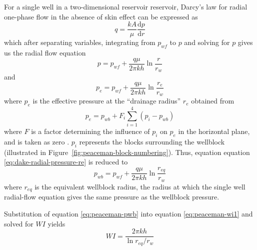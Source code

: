 For a single well in a two-dimensional reservoir reservoir, Darcy's law for radial one-phase flow in the absence of skin effect can be expressed as
\begin{equation}
    q = \frac{kA}{\mu} \frac{\mathrm{d}p}{\mathrm{d}r}
\end{equation}
which after separating variables, integrating from $p_{wf}$ to $p$ and solving for $p$ gives us the radial flow equation
\begin{equation}
    \label{eq:dake-radial-pressure}
    p = p_{wf} + \frac{q\mu}{2\pi kh} \ln{\frac{r}{r_w}}
\end{equation}
and
\begin{equation}
    \label{eq:dake-radial-pressure-re}
    p_e = p_{wf} + \frac{q\mu}{2\pi kh} \ln{\frac{r_e}{r_w}}
\end{equation}
where $p_e$ is the effective pressure at the ``drainage radius'' $r_e$ \citet{Dake1978Developments} obtained from
\begin{equation}
    \label{eq:peaceman-pe}
    p_e = p_{wb} + F_i \sum_{i=1}^{4}\left( p_i - p_{wb} \right)
\end{equation}
where $F$ is a factor determining the influence of $p_i$ on $p_e$ in the horizontal plane, and is taken as zero \citet{Schwabe1967Prediction,Peaceman1978Interpretation}. $p_i$ represents the blocks surrounding the wellblock (illustrated in Figure~\ref{fig:peaceman-block-numbering}). Thus, equation equation \eqref{eq:dake-radial-pressure-re} is reduced to
\begin{equation}
    \label{eq:peaceman-pwb}
    p_{wb} = p_{wf} + \frac{q\mu}{2\pi kh} \ln{\frac{r_{eq}}{r_w}}
\end{equation}
where $r_{eq}$ is the equivalent wellblock radius, the radius at which the single well radial-flow equation gives the same pressure as the wellblock pressure\citet{Peaceman1978Interpretation,Peaceman2003New}.

Substitution of equation \eqref{eq:peaceman-pwb} into equation \eqref{eq:peaceman-wi1} and solved for $WI$ yields
\begin{equation}
    \label{eq:peaceman-wi2}
    WI = \frac{2\pi kh}{\ln{r_{eq}/r_w}}
\end{equation}

